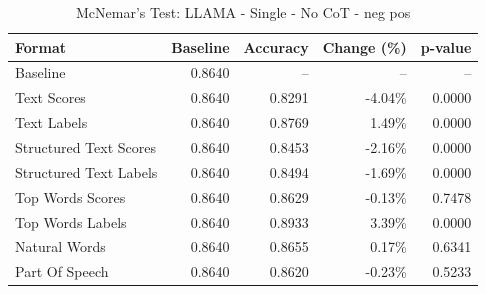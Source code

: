 \begin{table}[htbp]
\centering
\caption{McNemar's Test: LLAMA - Single - No CoT - neg pos}
\label{tab:llama-single-no_chain_of_thought-neg_pos}
\begin{tabular}{lrrrr}
\toprule
Format & Baseline & Accuracy & Change (\%) & p-value \\
\midrule
Baseline & 0.8640 & -- & -- & -- \\
Text Scores & 0.8640 & 0.8291 & -4.04\% & 0.0000 \\
Text Labels & 0.8640 & 0.8769 & 1.49\% & 0.0000 \\
Structured Text Scores & 0.8640 & 0.8453 & -2.16\% & 0.0000 \\
Structured Text Labels & 0.8640 & 0.8494 & -1.69\% & 0.0000 \\
Top Words Scores & 0.8640 & 0.8629 & -0.13\% & 0.7478 \\
Top Words Labels & 0.8640 & 0.8933 & 3.39\% & 0.0000 \\
Natural Words & 0.8640 & 0.8655 & 0.17\% & 0.6341 \\
Part Of Speech & 0.8640 & 0.8620 & -0.23\% & 0.5233 \\
\bottomrule
\end{tabular}
\end{table}